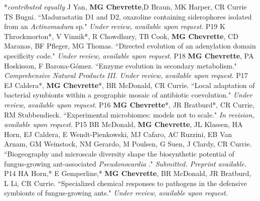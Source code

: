 


\begin{cvpubs}
   \cvpub
    {\hspace{-1cm} *\textit{contributed equally}} %
    {} %
   \cvpub
    {J Yan, \textbf{MG Chevrette},D Braun, MK Harper, CR Currie TS Bugni. ``Madurastatin D1 and D2, oxazoline containing siderophores isolated from an \textit{Actinomadura} sp." \textit{Under review, available upon request}.
    } %
    {P19}
   \cvpub
    {K Throckmorton*, V Vinnik*, R Chowdhury, TB Cook, \textbf{MG Chevrette}, CD Maranas, BF Pfleger, MG Thomas. ``Directed evolution of an adenylation domain specificity code." \textit{Under review, available upon request}.
    } %
    {P18}
   \cvpub
    {\textbf{MG Chevrette}, PA Hoskisson, F Barona-G\'{o}mez. ``Enzyme evolution in secondary metabolism." \textit{Comprehensive Natural Products III. Under review, available upon request}.
    } %
    {P17}
   \cvpub
    {EJ Caldera*, \textbf{MG Chevrette}*, BR McDonald, CR Currie. ``Local adaptation of bacterial symbionts within a geographic mosaic of antibiotic coevolution." \textit{Under review, available upon request}.
    } %
    {P16}
   \cvpub
    {\textbf{MG Chevrette}*, JR Bratburd*, CR Currie, RM Stubbendieck. ``Experimental microbiomes: models not to scale." \textit{In revision, available upon request}.
    } %
    {P15} %
   \cvpub
    {BR McDonald, \textbf{MG Chevrette}, JL Klassen, HA Horn, EJ Caldera, E Wendt-Pienkowski, MJ Cafaro, AC Ruzzini, EB Van Arnam, GM Weinstock, NM Gerardo, M Poulsen, G Suen, J Clardy, CR Currie. ``Biogeography and microscale diversity shape the biosynthetic potential of fungus-growing ant-associated \textit{Pseudonocardia}
." \textit{Submitted. Preprint available. \textbf{}}
    } %
    {P14} %
  \cvpub
    {HA Horn,* E Gemperline,* \textbf{MG Chevrette}, BR McDonald, JR Bratburd, L Li, CR Currie. ``Specialized chemical responses to pathogens in the defensive symbionts of fungus-growing ants." \textit{Under review, available upon request}.
}
\end{cvpubs}
